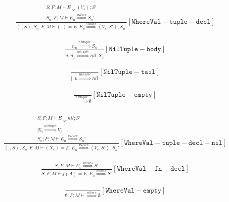 \documentclass{scrartcl}
\begin{document}
    \begin{align*}
    \frac{
        \begin{matrix}
        S; F; M \vdash E \Downarrow ( V_s ); S' \\
        S_n; F; M \vdash E_n \overset{values}{\Rightarrow} S_n'
        \end{matrix}
    }{
        \left<\_, S\right>, S_n; F; M \vdash ( \_ ) = E; E_n \overset{values}{\Rightarrow} \left< V_s, S' \right>, S_n'
    }[\mathtt{WhereVal-tuple-decl}]
    \end{align*}
    
    \begin{align*}
    \frac{
        n_n \overset{niltuple}{\Rightarrow} S_n
    }{
        n, n_n \overset{niltuple}{\Rightarrow} nil, S_n
    }[\mathtt{NilTuple-body}]
    \end{align*}
    
    \begin{align*}
    \frac{}{
        | \enspace n \overset{niltuple}{\Rightarrow} nil
    }[\mathtt{NilTuple-tail}]
    \end{align*}
    
    \begin{align*}
    \frac{}{
        \overset{niltuple}{\Rightarrow} \emptyset
    }[\mathtt{NilTuple-empty}]
    \end{align*}
    
    \begin{align*}
    \frac{
        \begin{matrix}
        S; F; M \vdash E \Downarrow nil; S' \\
        N_s \overset{niltuple}{\Rightarrow} V_s \\
        S_n; F; M \vdash E_n \overset{values}{\Rightarrow} S_n'
        \end{matrix}
    }{
        \left<\_, S\right>, S_n; F; M \vdash ( N_s ) = E; E_n \overset{values}{\Rightarrow} \left< V_s, S' \right>, S_n'
    }[\mathtt{WhereVal-tuple-decl-nil}]
    \end{align*}
    
    \begin{align*}
    \frac{
        S; F; M \vdash E_n \overset{values}{\Rightarrow} S'
    }{
        S; F; M \vdash f(A) = E; E_n \overset{values}{\Rightarrow} S'
    }[\mathtt{WhereVal-fn-decl}]
    \end{align*}
    
    \begin{align*}
    \frac{}{
        \emptyset; F; M \vdash \overset{values}{\Rightarrow} \emptyset
    }[\mathtt{WhereVal-empty}]
    \end{align*}
    
\end{document}
